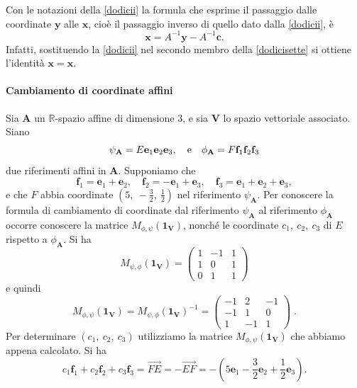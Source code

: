 \documentclass{article}
\theoremstyle{plain}
\theoremstyle{definition}
\theoremstyle{remark}
\begin{document}
\vspace{10pt}

Con le notazioni della \ref{dodicii} la formula che esprime il passaggio dalle coordinate $\mathbf{y}$ alle $\mathbf{x}$, cioè il passaggio inverso di quello dato dalla \ref{dodicii}, è
\begin{equation}\label{dodicisette}
\mathbf{x} = A^{-1} \mathbf{y} - A^{-1} \mathbf{c}.
\end{equation}
Infatti, sostituendo la \ref{dodicii} nel secondo membro della \ref{dodicisette} si ottiene l'identità $\mathbf{x} = \mathbf{x}$.

\vspace{10pt}

\paragraph{Cambiamento di coordinate affini}
Sia $\mathbf{A}$ un $\mathbb{R}$-spazio affine di dimensione $3$, e sia $\mathbf{V}$ lo spazio vettoriale associato. 
Siano 
\[\psi_\mathbf{A}=E\mathbf{e}_1\mathbf{e}_2\mathbf{e}_3,\quad\textup{e}\quad\phi_\mathbf{A}=F\mathbf{f}_1\mathbf{f}_2\mathbf{f}_3\]
due riferimenti affini in $\mathbf{A}$. 
Supponiamo che
\[
\mathbf{f}_1 = \mathbf{e}_1 + \mathbf{e}_2,\quad \mathbf{f}_2 = -\mathbf{e}_1 + \mathbf{e}_3,\quad \mathbf{f}_3 = \mathbf{e}_1 + \mathbf{e}_2 + \mathbf{e}_3,
\]
e che $F$ abbia coordinate $(5,\ -\frac{3}{2},\ \frac{1}{2})$ nel riferimento $\psi_\mathbf{A}$. 
Per conoscere la formula di cambiamento di coordinate dal riferimento $\psi_\mathbf{A}$ al riferimento 
$\phi_\mathbf{A}$ occorre conoscere la matrice $M_{\phi,\psi}(\mathbf{1_V})$, nonché le coordinate $c_1,\ c_2,\ c_3$ di $E$ 
rispetto a $\phi_\mathbf{A}$. Si ha
\[
M_{\psi,\phi}(\mathbf{1_V}) = 
\begin{pmatrix}
1 & -1 & 1 \\
1 & 0 & 1 \\
0 & 1 & 1
\end{pmatrix}
\]
e quindi
\[
M_{\phi,\psi}(\mathbf{1_V}) = M_{\psi,\phi}(\mathbf{1_V})^{-1} =
\begin{pmatrix}
-1 & 2 & -1 \\
-1 & 1 & 0 \\
1 & -1 & 1
\end{pmatrix}\;.
\]
Per determinare $(c_1,\ c_2,\ c_3)$ utilizziamo la matrice $M_{\phi,\psi}(\mathbf{1_V})$ che abbiamo appena calcolato. 
Si ha
\[
c_1\mathbf{f}_1 + c_2\mathbf{f}_2 + c_3\mathbf{f}_3 = \overrightarrow{FE} = -\overrightarrow{EF} = -\left(5\mathbf{e}_1 - \frac{3}{2}\mathbf{e}_2 + \frac{1}{2}\mathbf{e}_3\right).
\]
\end{document}
